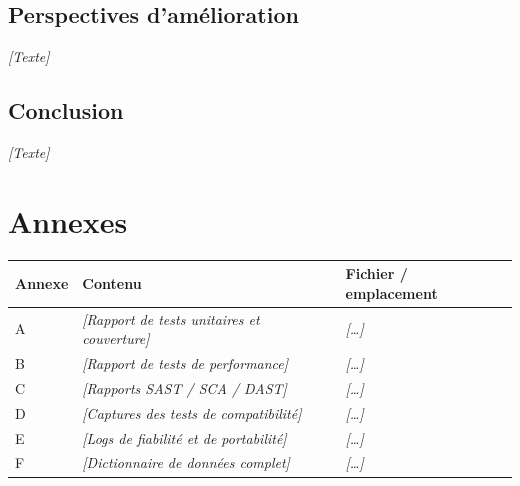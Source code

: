 \documentclass[11pt,a4paper]{article}
\newcommand{\ph}[1]{\textit{[#1]}}
\begin{document}
\subsection{Perspectives d'am\'elioration}
\ph{Texte}
\subsection{Conclusion}
\ph{Texte}

\newpage
\section*{Annexes}
\noindent\begin{tabularx}{\textwidth}{|L{2cm}|Y|Y|}\hline
\textbf{Annexe} & \textbf{Contenu} & \textbf{Fichier / emplacement} \\ \hline
A & \ph{Rapport de tests unitaires et couverture} & \ph{\dots} \\ \hline
B & \ph{Rapport de tests de performance} & \ph{\dots} \\ \hline
C & \ph{Rapports SAST / SCA / DAST} & \ph{\dots} \\ \hline
D & \ph{Captures des tests de compatibilit\'e} & \ph{\dots} \\ \hline
E & \ph{Logs de fiabilit\'e et de portabilit\'e} & \ph{\dots} \\ \hline
F & \ph{Dictionnaire de donn\'ees complet} & \ph{\dots} \\ \hline
\end{tabularx}
\end{document}
